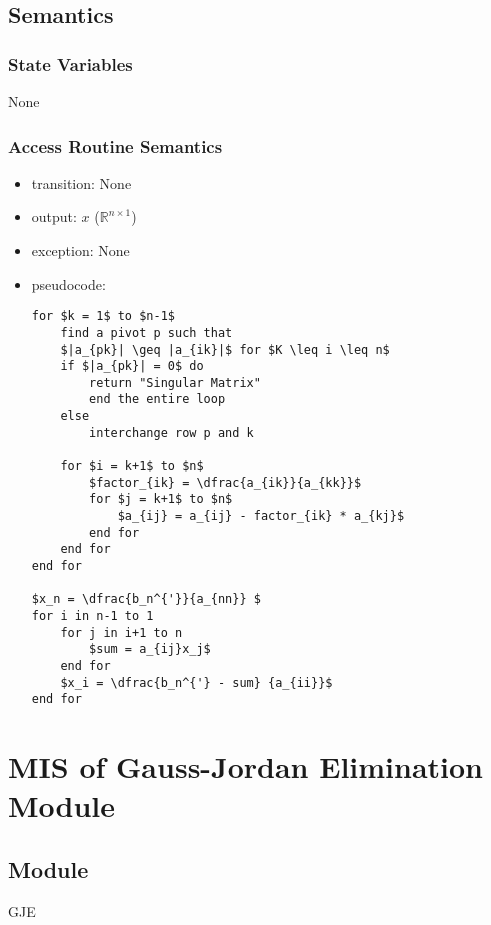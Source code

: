 \documentclass[12pt, titlepage]{article}
\begin{document}
\subsection{Semantics}

\subsubsection{State Variables}

None

\subsubsection{Access Routine Semantics}

\noindent %
\begin{itemize}
\item transition: None%
\item output: $x$ ($\mathbb{R}^{n \times 1}$)
\item exception: None%
\item pseudocode:
\begin{lstlisting}[mathescape=true]
for $k = 1$ to $n-1$
    find a pivot p such that
    $|a_{pk}| \geq |a_{ik}|$ for $K \leq i \leq n$
    if $|a_{pk}| = 0$ do
        return "Singular Matrix"
        end the entire loop
    else 
        interchange row p and k
        
    for $i = k+1$ to $n$
        $factor_{ik} = \dfrac{a_{ik}}{a_{kk}}$
        for $j = k+1$ to $n$
            $a_{ij} = a_{ij} - factor_{ik} * a_{kj}$
        end for
    end for
end for

$x_n = \dfrac{b_n^{'}}{a_{nn}} $
for i in n-1 to 1
    for j in i+1 to n
        $sum = a_{ij}x_j$
    end for
    $x_i = \dfrac{b_n^{'} - sum} {a_{ii}}$
end for
\end{lstlisting}
\end{itemize}

\section{MIS of {Gauss-Jordan Elimination  Module}} \label{modgje}

\subsection{Module}

GJE

\end{document}
